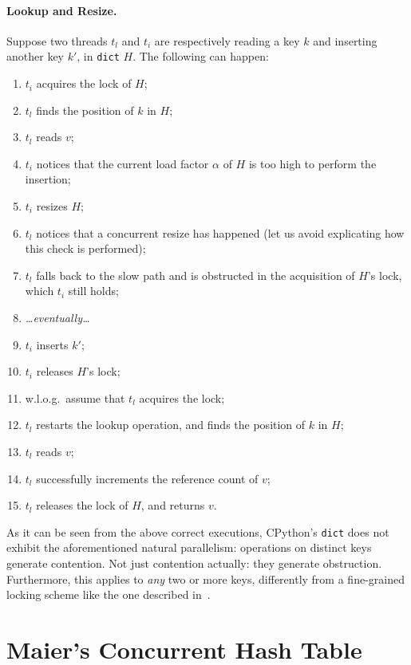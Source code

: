 \paragraph{Lookup and Resize.}
Suppose two threads $t_l$ and $t_i$ are respectively reading a key $k$ and inserting another key $k'$, in \texttt{dict} $H$.
The following can happen:
\begin{enumerate}
	\item $t_i$ acquires the lock of $H$;
	\item $t_l$ finds the position of $k$ in $H$;
	\item $t_l$ reads $v$;
	\item $t_i$ notices that the current load factor $\alpha$ of $H$ is too high to perform the insertion;
	\item $t_i$ resizes $H$;
	\item $t_l$ notices that a concurrent resize has happened (let us avoid explicating how this check is performed);
	\item $t_l$ falls back to the slow path and is obstructed in the acquisition of $H$'s lock, which $t_i$ still holds;
	\item \emph{{\ldots}eventually{\ldots}}
	\item $t_i$ inserts $k'$;
	\item $t_i$ releases $H$'s lock;
	\item w.l.o.g.\ assume that $t_l$ acquires the lock;
	\item $t_l$ restarts the lookup operation, and finds the position of $k$ in $H$;
	\item $t_l$ reads $v$;
	\item $t_l$ successfully increments the reference count of $v$;
	\item $t_l$ releases the lock of $H$, and returns $v$.
\end{enumerate}

As it can be seen from the above correct executions, CPython's \texttt{dict} does not exhibit the aforementioned natural parallelism: operations on distinct keys generate contention.
Not just contention actually: they generate obstruction.
Furthermore, this applies to \emph{any} two or more keys, differently from a fine-grained locking scheme like the one described in~\cite[\S13.2.2]{art-mp}.


\section{Maier's Concurrent Hash Table}\label{sec:maier-review}

